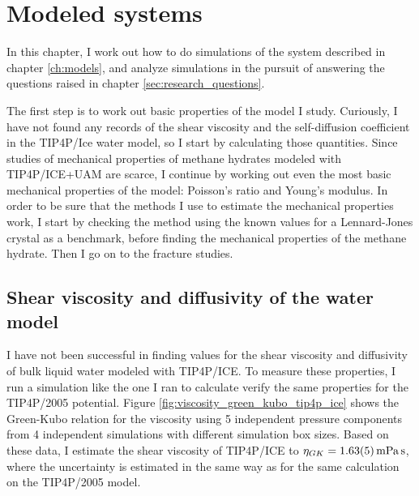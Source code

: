 
\chapter{Modeled systems}
\label{ch:modeledsystems}
In this chapter, I work out how to do simulations of the system described in chapter \ref{ch:models}, and analyze simulations in the pursuit of answering the questions raised in chapter \ref{sec:research_questions}.

The first step is to work out basic properties of the model I study. Curiously, I have not found any records of the shear viscosity and the self-diffusion coefficient in the TIP4P/Ice water model, so I start by calculating those quantities. Since studies of mechanical properties of methane hydrates modeled with TIP4P/ICE+UAM are scarce, I continue by working out even the most basic mechanical properties of the model: Poisson's ratio and Young's modulus. In order to be sure that the methods I use to estimate the mechanical properties work, I start by checking the method using the known values for a Lennard-Jones crystal as a benchmark, before finding the mechanical properties of the methane hydrate. Then I go on to the fracture studies.

\section{Shear viscosity and diffusivity of the water model}
I have not been successful in finding values for the shear viscosity and diffusivity of bulk liquid water modeled with TIP4P/ICE. To measure these properties, I run a simulation like the one I ran to calculate verify the same properties for the TIP4P/2005 potential. Figure \ref{fig:viscosity_green_kubo_tip4p_ice} shows the Green-Kubo relation for the viscosity using 5 independent pressure components from 4 independent simulations with different simulation box sizes. Based on these data, I estimate the shear viscosity of TIP4P/ICE to $\eta_{GK} = \text{\SI{1.63\pm 0.05}{\milli\pascal\second}}$, where the uncertainty is estimated in the same way as for the same calculation on the TIP4P/2005 model.

